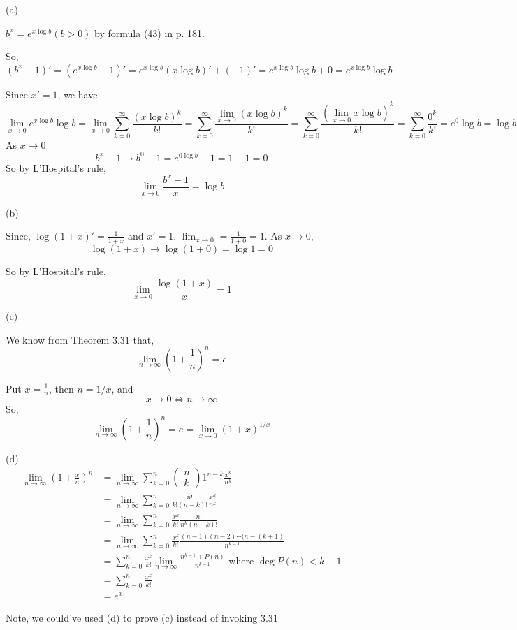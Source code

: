 \documentclass{article}
\begin{document}
(a)

$b^x = e^{x\log b} (b > 0)$ by formula (43) in p. 181.

So, $(b^x - 1)' = (e^{x\log b} - 1)' =e^{x\log b}(x \log b)' +(-1)' = e^{x\log
  b} \log b  + 0= e^{x\log
  b} \log b$

Since $x' = 1$, we have\[\lim_{x\rightarrow 0} e^{x\log
    b} \log b = \lim_{x\rightarrow 0} \sum_{k = 0}^\infty \frac{\left( x \log b
    \right)^k}{k!} = \sum_{k = 0}^\infty
  \frac{\lim_{x\rightarrow 0} \left( x \log b
    \right)^k}{k!} = \sum_{k = 0}^\infty
  \frac{ \left( \lim_{x\rightarrow 0} x \log b
    \right)^k}{k!} = \sum_{k = 0}^\infty
  \frac{ 0^k}{k!} =  e^0 \log b
  = \log b\]
 As $x\rightarrow 0$ \[b^x-1 \longrightarrow b^0-1 = e^{0\log b} -1 =
   1-1 = 0\]
 So by L'Hospital's rule,
 \[\lim_{x\rightarrow 0}\frac{b^x-1}{x} = \log b\]

 (b)

 Since, $\log(1+x)' = \frac{1}{1+x}$ and $x' = 1$. $\lim_{x\rightarrow
   0} = \frac{1}{1+0} =1$.
 As $x\rightarrow 0$,\[\log(1+x) \longrightarrow \log(1+0) = \log 1 = 0\]

 So by L'Hospital's rule,
 \[\lim_{x\rightarrow 0} \frac{\log(1+x)}{x} = 1\]

 (c)

 We know from Theorem $3.31$ that, \[\lim_{n\rightarrow \infty}\left(
     1 + \frac{1}{n} \right)^n = e\]

 Put $x = \frac{1}{n}$, then $n = 1/x$, and  \[x \longrightarrow 0 \iff
   n\longrightarrow \infty \]
 So, \[\lim_{n\rightarrow \infty}\left(
     1 + \frac{1}{n} \right)^n = e = \lim_{x\rightarrow 0} \left( 1 +
     x\right)^{1/x}\]

(d)
\begin{align*}
   \lim_{n\rightarrow \infty}\left( 1 + \frac{x}{n} \right)^n
   &= \lim_{n\rightarrow \infty} \sum_{k=0}^n\begin{pmatrix}n\\k\end{pmatrix}
   1^{n-k}\frac{x^{k}}{n^{k}}\\
   &= \lim_{n\rightarrow \infty} \sum_{k=0}^n\frac{n!}{k!(n-k)!} \frac{x^{k}}{n^{k}}\\
   &= \lim_{n\rightarrow \infty} \sum_{k=0}^n\frac{x^{k}}{k!}
     \frac{n!}{n^{k}(n-k)!}\\
   &= \lim_{n\rightarrow \infty} \sum_{k=0}^n\frac{x^{k}}{k!}
     \frac{(n-1)(n-2)\cdots(n-(k+1)}{n^{k-1}}\\
  &= \sum_{k=0}^n\frac{x^{k}}{k!} \lim_{n\rightarrow \infty}
    \frac{n^{k-1}+ P(n)}{n^{k-1}}\text{ where }\deg P(n) < k-1\\
     &= \sum_{k=0}^n\frac{x^{k}}{k!} \\
  &= e^x
\end{align*}

Note, we could've used (d) to prove (c) instead of invoking $3.31$
\end{document}
